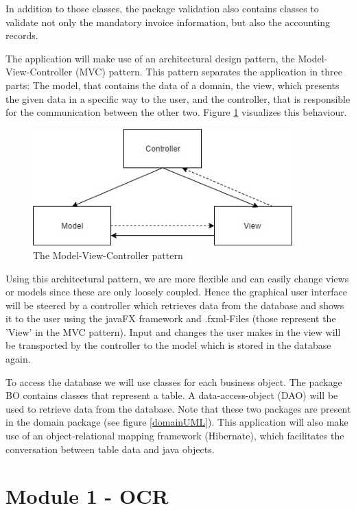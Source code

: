 In addition to those classes, the package validation also contains classes to validate not only the mandatory invoice information, but also the accounting records.

The application will make use of an architectural design pattern, the Model-View-Controller (MVC) pattern.
This pattern separates the application in three parts: The model, that contains the data of a domain, the view, which presents the given data in a specific way to the user, and the controller, that is responsible for the communication between the other two. Figure \ref{MVCpattern} visualizes this behaviour.

\begin{figure}[ht!]
\centering
\includegraphics[width=100mm]{Images/UML/MVC.jpg}
\caption{The Model-View-Controller pattern \label{MVCpattern}}
\end{figure}

Using this architectural pattern, we are more flexible and can easily change views or models since these are only loosely coupled. Hence the graphical user interface will be steered by a controller which retrieves data from the database and shows it to the user using the javaFX framework and .fxml-Files (those represent the 'View' in the MVC pattern). Input and changes the user makes in the view will be transported by the controller to the model which is stored in the database again.

To access the database we will use classes for each business object. The package BO contains classes that represent a table. A data-access-object (DAO) will be used to retrieve data from the database. Note that these two packages are present in the domain package (see figure \ref{domainUML}).
This application will also make use of an object-relational mapping framework (Hibernate), which facilitates the conversation between table data and java objects.

\section{Module 1 - OCR}

